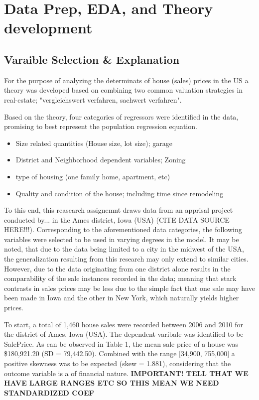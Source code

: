 \documentclass{article}
\begin{document}
\section{Data Prep, EDA, and Theory development}
\subsection{Varaible Selection \& Explanation}
\indent For the purpose of analyzing the determinats of house (sales) prices in the US a theory was developed based on combining two common valuation strategies in real-estate; "vergleichswert verfahren, sachwert verfahren".

\indent Based on the theory, four categories of regressors were identified in the data, promising to best represent the population regression equation. 
\begin{itemize}
  \item Size related quantities (House size, lot size); garage
  \item District and Neighborhood dependent variables; Zoning
  \item type of housing (one family home, apartment, etc)
  \item Quality and condition of the house; including time since remodeling
\end{itemize}

To this end, this reasearch assignemnt draws data from an apprisal project conducted by... in the Ames district, Iowa (USA) (CITE DATA SOURCE HERE!!!). Corresponding to the aforementioned data categories, the following variables were selected to be used in varying degrees in the model. It may be noted, that due to the data being limited to a city in the midwest of the USA, the generalization resulting from this research may only extend to similar cities. However, due to the data originating from one district alone results in the comparability of the sale instances recorded in the data; meaning that stark contrasts in sales prices may be less due to the simple fact that one sale may have been made in Iowa and the other in New York, which naturally yields higher prices.

To start, a total of 1,460 house sales were recorded between 2006 and 2010 for the district of Ames, Iowa (USA). The dependent varibale was identified to be SalePrice. As can be observed in Table 1, the mean sale price of a house was \$180,921.20 (SD = 79,442.50). Combined with the range [34,900, 755,000] a positive skewness was to be expected (skew = 1.881), considering that the outcome variable is a of financial nature.
\textbf{IMPORTANT! TELL THAT WE HAVE LARGE RANGES ETC SO THIS MEAN WE NEED STANDARDIZED COEF}
\end{document}
